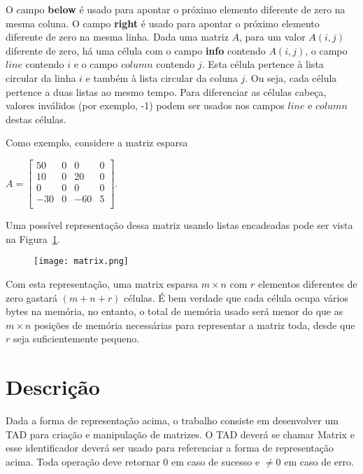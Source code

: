 \documentclass[a4paper,10pt]{article}
\begin{document}
O campo \textbf{below} é usado para apontar o próximo elemento diferente de zero na mesma coluna. O campo \textbf{right} é usado para apontar o próximo elemento diferente de zero na mesma linha. Dada uma matriz $A$, para um valor $A(i, j)$ diferente de zero, há uma célula com o campo \textbf{info} contendo $A(i, j)$, o campo $line$ contendo $i$ e o campo $column$ contendo $j$. Esta célula pertence à lista circular da linha $i$ e também à lista circular da coluna $j$. Ou seja, cada célula pertence a duas listas ao mesmo tempo. Para diferenciar as células cabeça, valores inválidos (por exemplo, -1) podem ser usados nos campos $line$ e $column$ destas células.

Como exemplo, considere a matriz esparsa

$A = \begin{bmatrix}
50 & 0 & 0 & 0 \\
10 & 0 & 20 & 0 \\
0 & 0 & 0 & 0 \\
-30 & 0 & -60 & 5 \\
\end{bmatrix}$.

Uma possível representação dessa matriz usando listas encadeadas pode ser vista na Figura~\ref{fig_matrix}.

\begin{figure}[htp]
\texttt{[image: matrix.png]}
\label{fig_matrix}
\end{figure}



Com esta representação, uma matrix esparsa $m \times n$ com $r$ elementos diferentes de zero gastará $(m + n + r)$ células. É bem verdade que cada célula ocupa vários bytes na memória, no entanto, o total de memória usado será menor do que as $m \times n$ posições de memória necessárias para representar a matriz toda, desde que $r$ seja suficientemente pequeno.


\section*{Descrição}

Dada a forma de representação acima, o trabalho consiste em desenvolver um TAD para criação e manipulação de matrizes. O TAD deverá se chamar Matrix e esse identificador deverá ser usado para referenciar a forma de representação acima. Toda operação deve retornar $0$ em caso de sucesso e $\neq 0$ em caso de erro.
\end{document}
